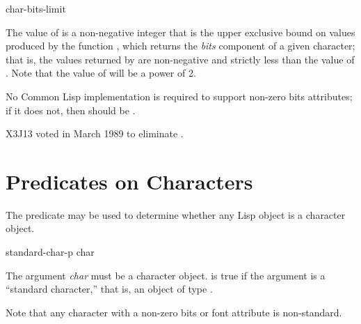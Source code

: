 \begin{obsolete}
\begin{defun}[Constant]
char-bits-limit

The value of  is a non-negative
integer that is the upper exclusive bound on values produced
by the function , which returns the {\it bits} component
of a given character; that is, the values returned by 
are non-negative and strictly less than the value of
.  Note that the value of 
will be a power of 2.

\beforenoterule
\begin{implementation}
No Common Lisp implementation is required to support
non-zero bits attributes; if it does not, then 
should be .
\end{implementation}
\afternoterule
\end{defun}
\end{obsolete}

\begin{newer}
X3J13 voted in March 1989 
to eliminate .
\end{newer}

\section{Predicates on Characters}

The predicate  may be used to determine
whether any Lisp object is a character object.

\begin{defun}[Function]
standard-char-p char

The argument {\it char} must be a character object.
 is true if the argument is a ``standard character,''
that is, an object of type .

Note that any character with a non-zero bits or
font attribute is non-standard.
\end{defun}

